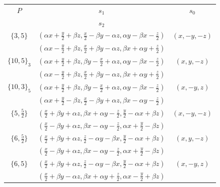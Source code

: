 \documentclass[12pt]{article}
\theoremstyle{definition}\newtheorem{definition}{Definition}[section]
\begin{document}
\begin{table}
\begin{center}
\begin{tabular}{ |c|c|c| } 
 \hline
 \rule{0pt}{2.25ex} $P$ & $s_1$ & $s_0$  \\ [0.25ex]
 \rule{0pt}{2.25ex}  & $s_2$ &   \\ [0.25ex]
 \hline
 \rule{0pt}{2.25ex} $\{3,5\}$ & $(\alpha x +\frac{y}{2} +\beta z,\frac{x}{2}-\beta y-\alpha z, \alpha y - \beta x-\frac{z}{2})$ & $(x,-y,-z)$  \\ [0.25ex]
 \rule{0pt}{2.25ex}  & $(\alpha x-\frac{y}{2}+\beta z,\frac{x}{2}+\beta y-\alpha z,\beta x+\alpha y + \frac{z}{2})$ &   \\ [0.25ex]
 \hline
 \rule{0pt}{2.25ex} $\{10,5\}_3$ & $(\alpha x+\frac{y}{2}+\beta z,\beta y-\frac{x}{2}+\alpha z,\alpha y-\beta x -\frac{z}{2})$ & $(x,y,-z)$  \\ [0.25ex]
 \rule{0pt}{2.25ex}  & $(\alpha x-\frac{y}{2}+\beta z,\frac{x}{2}+\beta y-\alpha z, \beta x +\alpha y+\frac{z}{2})$ &   \\ [0.25ex]
 \hline
 \rule{0pt}{2.25ex} $\{10,3\}_5$ & $(\alpha x+\frac{y}{2}+\beta z,\beta y -\frac{x}{2}+\alpha z, \alpha y-\beta x -\frac{z}{2})$ & $(x,-y,z)$  \\ [0.25ex]
 \rule{0pt}{2.25ex}  & $(\alpha x+\frac{y}{2}-\beta z,\frac{x}{2}-\beta y+\alpha z,\beta x-\alpha y -\frac{z}{2})$ &   \\ [0.25ex]
 \hline
 \rule{0pt}{2.25ex} $\{5,\frac{5}{2}\}$ & $(\frac{x}{2} + \beta y + \alpha z, \beta x + \alpha y - \frac{z}{2}, \frac{y}{2} - \alpha x + \beta z)$ & $(x,-y,-z)$  \\ [0.25ex]
 \rule{0pt}{2.25ex}  & $(\frac{x}{2} - \beta y + \alpha z, \beta x - \alpha y - \frac{z}{2}, \alpha x + \frac{y}{2} - \beta z)$ &   \\ [0.25ex]
 \hline
 \rule{0pt}{2.25ex} $\{6,\frac{5}{2}\}$ & $(\frac{x}{2} + \beta y + \alpha z, \frac{z}{2} - \alpha y - \beta x, \frac{y}{2} - \alpha x + \beta z)$ & $(x,y,-z)$  \\ [0.25ex]
 \rule{0pt}{2.25ex}  & $(\frac{x}{2} - \beta y + \alpha z, \beta x - \alpha y - \frac{z}{2}, \alpha x + \frac{y}{2} - \beta z)$ &   \\ [0.25ex]
 \hline
 \rule{0pt}{2.25ex} $\{6,5\}$ & $(\frac{x}{2} + \beta y + \alpha z, \frac{z}{2} - \alpha y - \beta x, \frac{y}{2} - \alpha x + \beta z)$ & $(x,-y,z)$  \\ [0.25ex]
 \rule{0pt}{2.25ex}  & $(\frac{x}{2} + \beta y - \alpha z, \beta x + \alpha y + \frac{z}{2}, \alpha x - \frac{y}{2} + \beta z)$ &   \\ [0.25ex]

\end{tabular}
\end{center}
\end{table}
\end{document}
